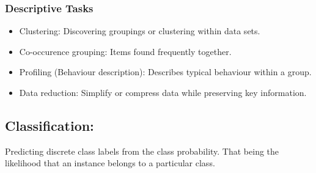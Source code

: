 \documentclass[a5paper]{article}
\begin{document}
	\subsubsection{Descriptive Tasks}
	\begin{itemize}
		\item Clustering: Discovering groupings or clustering within data sets.
		\item Co-occurence grouping: Items found frequently together.
		\item Profiling (Behaviour description): Describes typical behaviour within a group.
		\item Data reduction: Simplify or compress data while preserving key information.
	\end{itemize}
	\subsection{Classification:}
	Predicting discrete class labels from the class probability. That being the likelihood that an instance belongs to a particular class.
\end{document}
